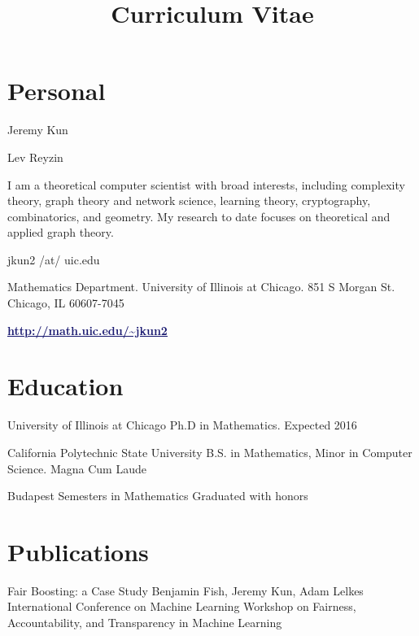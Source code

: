 \documentclass[11pt]{moderncv}
\title{Curriculum Vitae}
\begin{document}
   \maketitle

      \section{Personal}
         {Jeremy Kun}

         {Lev Reyzin}

         {I am a theoretical computer scientist with broad interests, including complexity theory, graph theory and network science, learning theory, cryptography, combinatorics, and geometry. My research to date focuses on theoretical and applied graph theory.}

         {jkun2 /at/ uic.edu}

         {Mathematics Department. University of Illinois at Chicago. 851 S Morgan St. Chicago, IL 60607-7045}

         {\href{http://math.uic.edu/~jkun2}{\textcolor{MidnightBlue}{\underline{\textbf{http://math.uic.edu/\textasciitilde{}jkun2}}}}}


   \section{Education}
         {University of Illinois at Chicago}
      {}
      {Ph.D in Mathematics.}
      {Expected 2016}
      {}

         {California Polytechnic State University}
      {}
      {B.S. in Mathematics, Minor in Computer Science.}
      {Magna Cum Laude}
      {}

         {Budapest Semesters in Mathematics}
      {}
{}
      {Graduated with honors}
      {}


   \section{Publications}
         {Fair Boosting: a Case Study}
      {Benjamin Fish, Jeremy Kun, Adam Lelkes}
      {International Conference on Machine Learning Workshop on Fairness, Accountability, and Transparency in Machine Learning}
      {}
      {}
\end{document}
